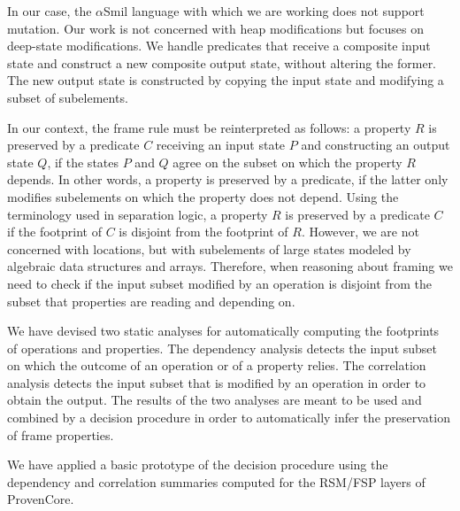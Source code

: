 \documentclass[11pt]{article}
\def\pcore{\textsf{ProvenCore}}
\def\asmil{\textsf{$\alpha$Smil}}
\begin{document}
In our case, the {\asmil} language with which we are working does not
support mutation. Our work is not concerned with heap modifications but
focuses on deep-state modifications. We handle predicates that receive a 
composite input state and construct a new 
composite output state, without altering the former. The new output state is 
constructed by copying the input state and modifying a subset of subelements. 

In our context, the frame rule must be reinterpreted as follows: a property 
$R$ is preserved by a predicate $C$ receiving 
an input state $P$ and constructing an output state $Q$, if the states $P$ and $Q$ 
agree on the subset on which the property $R$ depends.
In other 
words, a property is preserved by a predicate, if the latter only modifies 
subelements on which the property does not depend. Using the terminology used
in separation logic, a property $R$ is preserved by a predicate $C$ if the 
footprint of $C$ is disjoint from the footprint of $R$. However, 
we are not concerned with locations, but with subelements of large states modeled
by algebraic data structures and arrays. Therefore, when reasoning about framing
we need to check if the input subset
modified by an operation is disjoint from the subset that properties are reading 
and depending on. %

We have devised two static analyses for automatically computing the footprints 
of operations and properties. The dependency analysis detects the input subset 
on which the outcome of an operation or of a property relies. The 
correlation analysis detects the input subset that is modified by an operation 
in order to obtain the output. The results of the two analyses are meant to be
used and combined by a decision procedure in order to automatically infer the
preservation of frame properties.   

We  have applied  a  basic  prototype of  the  decision  procedure using  the
dependency  and correlation  summaries  computed for  the  RSM/FSP layers  of
\pcore{}.

\end{document}

